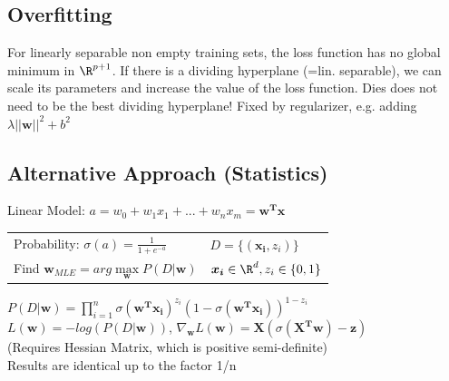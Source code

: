 \documentclass[english]{latex4ei/latex4ei_sheet}
\begin{document}
\begin{sectionbox}
\subsection{Overfitting}
For linearly separable non empty training sets, the loss function has no global minimum in $\R^{p+1}$. If there is a dividing hyperplane (=lin. separable), we can scale its parameters and increase the value of the loss function. Dies does not need to be the best dividing hyperplane! Fixed by regularizer, e.g. adding $\lambda||\boldsymbol{w}||^2+b^2$

\subsection{Alternative Approach (Statistics)}
Linear Model: $a = w_0+w_1x_1+...+w_nx_m = \boldsymbol{w^Tx}$\\
\begin{tabular}{ll}
    Probability: $\sigma(a)=\frac{1}{1+e^{-a}}$ & $D=\{(\boldsymbol{x_i},z_i)\}$\\
    Find $\boldsymbol{w}_{MLE}=arg \max\limits_{\boldsymbol{w}} P(D|\boldsymbol{w})$ &  $\boldsymbol{x_i}\in \R^d, z_i\in\{0,1\}$\\
\end{tabular}
$P(D|\boldsymbol{w})=\prod\limits_{i=1}^n\sigma(\boldsymbol{w^Tx_i})^{z_i}(1-\sigma(\boldsymbol{w^Tx_i}))^{1-z_i}$\\
$L(\boldsymbol{w})=-log(P(D|\boldsymbol{w}))$, $\nabla_{\boldsymbol{w}}L(\boldsymbol{w})=\boldsymbol{X}(\sigma(\boldsymbol{X^Tw})-\boldsymbol{z})$\\
(Requires Hessian Matrix, which is positive semi-definite)\\
Results are identical up to the factor 1/n
\end{sectionbox}
\end{document}
